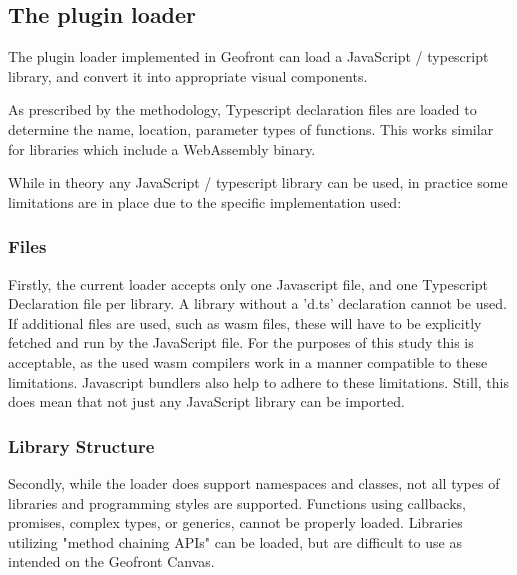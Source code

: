 \subsection{The plugin loader}
\label{sec:implementation:loading:limits}

The plugin loader implemented in Geofront can load a JavaScript / typescript library, and convert it into appropriate visual components. 

As prescribed by the methodology, Typescript declaration files are loaded to determine the name, location, parameter types of functions. 
This works similar for libraries which include a WebAssembly binary.

While in theory any JavaScript / typescript library can be used, in practice some limitations are in place due to the specific implementation used:

\subsubsection*{Files}
Firstly, the current loader accepts only one Javascript file, and one Typescript Declaration file per library.
A library without a 'd.ts' declaration cannot be used. 
If additional files are used, such as \ac{wasm} files, these will have to be explicitly fetched and run by the JavaScript file. 
For the purposes of this study this is acceptable, as the used \ac{wasm} compilers work in a manner compatible to these limitations.
Javascript bundlers also help to adhere to these limitations.
Still, this does mean that not just any JavaScript library can be imported. 

\subsubsection*{Library Structure}
Secondly, while the loader does support namespaces and classes, not all types of libraries and programming styles are supported. 
Functions using callbacks, promises, complex types, or generics, cannot be properly loaded. 
Libraries utilizing "method chaining APIs" can be loaded, but are difficult to use as intended on the Geofront Canvas.

